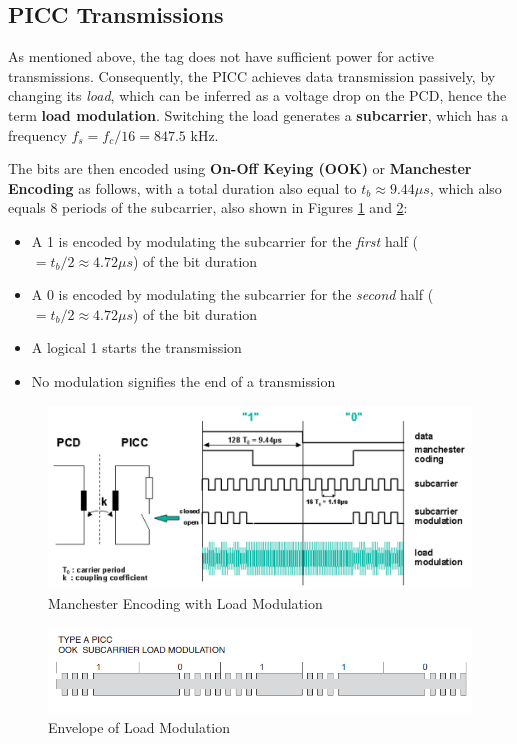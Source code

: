 \documentclass[fleqn,10pt]{SelfArx} %
\newcommand{\ms}{\ensuremath{\mu s} }
\begin{document}
\subsection{PICC Transmissions}
\label{subsec:picc}

As mentioned above, the tag does not have sufficient power for active transmissions. Consequently, the PICC achieves data transmission passively, by changing its {\em load}, which can be inferred as a voltage drop on the PCD, hence the term {\bf load modulation}. Switching the load generates a {\bf subcarrier}, which has a frequency $f_s=f_c/16=847.5$ kHz. 

The bits are then encoded using {\bf On-Off Keying (OOK)} or {\bf Manchester Encoding} as follows, with a total duration also equal to $t_b\approx9.44\ms$, which also equals 8 periods of the subcarrier, also shown in Figures \ref{fig:manchester} and \ref{fig:manchester2}:

\begin{itemize}[noitemsep] 
\item A 1 is encoded by modulating the subcarrier for the {\em first} half ($=t_b/2\approx4.72\ms$) of the bit duration
\item A 0  is encoded by modulating the subcarrier for the {\em second} half ($=t_b/2\approx4.72\ms$) of the bit duration
\item A logical 1 starts the transmission
\item No modulation signifies the end of a transmission
\end{itemize}


\begin{figure}[h]
  \includegraphics[width=\linewidth]{img/manchester2.png}
  \caption{Manchester Encoding with Load Modulation \cite{mifare}}
  \label{fig:manchester}
\end{figure}

\begin{figure}[h]
  \includegraphics[width=\linewidth]{img/manchester.png}
  \caption{Envelope of Load Modulation \cite{atmel}}
  \label{fig:manchester2}
\end{figure}
\end{document}
